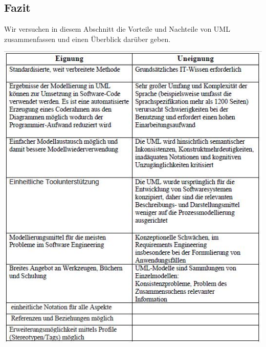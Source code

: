 \subsection{Fazit}

Wir versuchen in diesem Abschnitt die Vorteile und Nachteile von UML zusammenfassen und einen Überblick darüber geben.


		
		\includegraphics[scale=1]{Graphics/vornachteil.jpg} 
		
		
		

